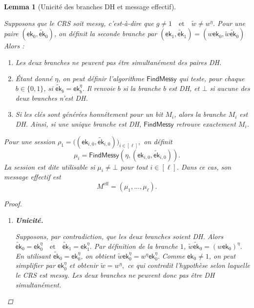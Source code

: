 \documentclass[10pt,a4paper]{article}
\theoremstyle{definition}
\theoremstyle{plain}
\newtheorem{lemma}[definition]{Lemma}
\theoremstyle{remark}
\begin{document}
\begin{lemma}[Unicité des branches DH et message effectif]
\label{lem:find-messy}

Supposons que le CRS soit messy, c'est-à-dire que
$
g\neq 1
\quad\text{et}\quad
\widetilde{w}\neq w^\eta.
$
Pour une paire
$(\mathsf{ek}_0,\widetilde{\mathsf{ek}}_0)$, on définit la seconde
branche par
$
(\mathsf{ek}_1,\widetilde{\mathsf{ek}}_1)=(w\mathsf{ek}_0,\widetilde{w}\widetilde{\mathsf{ek}}_0)
$
Alors :

\begin{enumerate}
    \item[\textnormal{(i)}] Les deux branches ne peuvent pas être
    simultanément des paires DH.

    \item[\textnormal{(ii)}] Étant donné $\eta$, on peut définir
    l'algorithme $\mathsf{FindMessy}$ qui teste, pour chaque
    $b\in\{0,1\}$, si
    $
    \widetilde{\mathsf{ek}}_b
    =
    \mathsf{ek}_b^\eta.
    $
    Il renvoie $b$ si la branche $b$ est DH, et $\bot$ si aucune des
    deux branches n'est DH.

    \item[\textnormal{(iii)}] Si les clés sont générées honnêtement
    pour un bit $M_i$, alors la branche $M_i$ est DH. Ainsi, si une
    unique branche est DH, $\mathsf{FindMessy}$ retrouve exactement
    $M_i$.
\end{enumerate}
Pour une session
$
\rho_1=
\bigl(
(\mathsf{ek}_{i,0},\widetilde{\mathsf{ek}}_{i,0})
\bigr)_{i\in[\ell]},
$
on définit
\[
\mu_i
=
\mathsf{FindMessy}
\left(
\eta,
(\mathsf{ek}_{i,0},\widetilde{\mathsf{ek}}_{i,0})
\right).
\]
La session est dite utilisable si
$\mu_i\neq\bot$ pour tout $i\in[\ell]$. Dans ce cas, son message
effectif est
\[
M^{\mathrm{eff}}
=
(\mu_1,\ldots,\mu_\ell).
\]

\begin{proof}
\begin{enumerate}
    \item[\textnormal{(i)}] \textbf{Unicité.}

    Supposons, par contradiction, que les deux branches soient DH. Alors
    $
    \widetilde{\mathsf{ek}}_0
    =
    \mathsf{ek}_0^\eta
    \quad\text{et}\quad
    \widetilde{\mathsf{ek}}_1
    =
    \mathsf{ek}_1^\eta.
    $
    Par définition de la branche $1$,
    $
    \widetilde{w}\widetilde{\mathsf{ek}}_0
    =
    (w\mathsf{ek}_0)^\eta.
    $
    En utilisant
    $\widetilde{\mathsf{ek}}_0=\mathsf{ek}_0^\eta$, on obtient
    $
    \widetilde{w}\mathsf{ek}_0^\eta
    =
    w^\eta\mathsf{ek}_0^\eta.
    $
    Comme $\mathsf{ek}_0\neq 1$, on peut simplifier par
    $\mathsf{ek}_0^\eta$ et obtenir
    $
    \widetilde{w}=w^\eta,
    $
    ce qui contredit l'hypothèse selon laquelle le CRS est messy.
    Les deux branches ne peuvent donc pas être DH simultanément.


\end{enumerate}
\end{proof}
\end{lemma}
\end{document}
